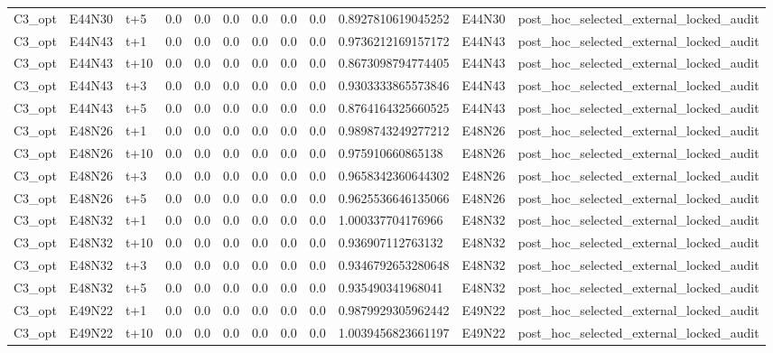 \begin{landscape}
\begin{longtable}{llllllllllll}
C3\_opt & E44N30 & t+5 & 0.0 & 0.0 & 0.0 & 0.0 & 0.0 & 0.0 & 0.8927810619045252 & E44N30 & post\_hoc\_selected\_external\_locked\_audit \\
C3\_opt & E44N43 & t+1 & 0.0 & 0.0 & 0.0 & 0.0 & 0.0 & 0.0 & 0.9736212169157172 & E44N43 & post\_hoc\_selected\_external\_locked\_audit \\
C3\_opt & E44N43 & t+10 & 0.0 & 0.0 & 0.0 & 0.0 & 0.0 & 0.0 & 0.8673098794774405 & E44N43 & post\_hoc\_selected\_external\_locked\_audit \\
C3\_opt & E44N43 & t+3 & 0.0 & 0.0 & 0.0 & 0.0 & 0.0 & 0.0 & 0.9303333865573846 & E44N43 & post\_hoc\_selected\_external\_locked\_audit \\
C3\_opt & E44N43 & t+5 & 0.0 & 0.0 & 0.0 & 0.0 & 0.0 & 0.0 & 0.8764164325660525 & E44N43 & post\_hoc\_selected\_external\_locked\_audit \\
C3\_opt & E48N26 & t+1 & 0.0 & 0.0 & 0.0 & 0.0 & 0.0 & 0.0 & 0.9898743249277212 & E48N26 & post\_hoc\_selected\_external\_locked\_audit \\
C3\_opt & E48N26 & t+10 & 0.0 & 0.0 & 0.0 & 0.0 & 0.0 & 0.0 & 0.975910660865138 & E48N26 & post\_hoc\_selected\_external\_locked\_audit \\
C3\_opt & E48N26 & t+3 & 0.0 & 0.0 & 0.0 & 0.0 & 0.0 & 0.0 & 0.9658342360644302 & E48N26 & post\_hoc\_selected\_external\_locked\_audit \\
C3\_opt & E48N26 & t+5 & 0.0 & 0.0 & 0.0 & 0.0 & 0.0 & 0.0 & 0.9625536646135066 & E48N26 & post\_hoc\_selected\_external\_locked\_audit \\
C3\_opt & E48N32 & t+1 & 0.0 & 0.0 & 0.0 & 0.0 & 0.0 & 0.0 & 1.000337704176966 & E48N32 & post\_hoc\_selected\_external\_locked\_audit \\
C3\_opt & E48N32 & t+10 & 0.0 & 0.0 & 0.0 & 0.0 & 0.0 & 0.0 & 0.936907112763132 & E48N32 & post\_hoc\_selected\_external\_locked\_audit \\
C3\_opt & E48N32 & t+3 & 0.0 & 0.0 & 0.0 & 0.0 & 0.0 & 0.0 & 0.9346792653280648 & E48N32 & post\_hoc\_selected\_external\_locked\_audit \\
C3\_opt & E48N32 & t+5 & 0.0 & 0.0 & 0.0 & 0.0 & 0.0 & 0.0 & 0.935490341968041 & E48N32 & post\_hoc\_selected\_external\_locked\_audit \\
C3\_opt & E49N22 & t+1 & 0.0 & 0.0 & 0.0 & 0.0 & 0.0 & 0.0 & 0.9879929305962442 & E49N22 & post\_hoc\_selected\_external\_locked\_audit \\
C3\_opt & E49N22 & t+10 & 0.0 & 0.0 & 0.0 & 0.0 & 0.0 & 0.0 & 1.0039456823661197 & E49N22 & post\_hoc\_selected\_external\_locked\_audit \\

\end{longtable}
\end{landscape}
